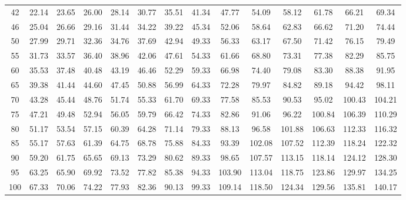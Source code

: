 \begin{center}
\begin{tabular}{c | c c c c c c c c c c c c c}
42 & 22.14 & 23.65 & 26.00 & 28.14 & 30.77 & 35.51 & 41.34 & 47.77 & 54.09 & 58.12 & 61.78 & 66.21 & 69.34 \\
46 & 25.04 & 26.66 & 29.16 & 31.44 & 34.22 & 39.22 & 45.34 & 52.06 & 58.64 & 62.83 & 66.62 & 71.20 & 74.44 \\
50 & 27.99 & 29.71 & 32.36 & 34.76 & 37.69 & 42.94 & 49.33 & 56.33 & 63.17 & 67.50 & 71.42 & 76.15 & 79.49 \\
55 & 31.73 & 33.57 & 36.40 & 38.96 & 42.06 & 47.61 & 54.33 & 61.66 & 68.80 & 73.31 & 77.38 & 82.29 & 85.75 \\
60 & 35.53 & 37.48 & 40.48 & 43.19 & 46.46 & 52.29 & 59.33 & 66.98 & 74.40 & 79.08 & 83.30 & 88.38 & 91.95 \\
65 & 39.38 & 41.44 & 44.60 & 47.45 & 50.88 & 56.99 & 64.33 & 72.28 & 79.97 & 84.82 & 89.18 & 94.42 & 98.11 \\
70 & 43.28 & 45.44 & 48.76 & 51.74 & 55.33 & 61.70 & 69.33 & 77.58 & 85.53 & 90.53 & 95.02 & 100.43 & 104.21 \\
75 & 47.21 & 49.48 & 52.94 & 56.05 & 59.79 & 66.42 & 74.33 & 82.86 & 91.06 & 96.22 & 100.84 & 106.39 & 110.29 \\
80 & 51.17 & 53.54 & 57.15 & 60.39 & 64.28 & 71.14 & 79.33 & 88.13 & 96.58 & 101.88 & 106.63 & 112.33 & 116.32 \\
85 & 55.17 & 57.63 & 61.39 & 64.75 & 68.78 & 75.88 & 84.33 & 93.39 & 102.08 & 107.52 & 112.39 & 118.24 & 122.32 \\
90 & 59.20 & 61.75 & 65.65 & 69.13 & 73.29 & 80.62 & 89.33 & 98.65 & 107.57 & 113.15 & 118.14 & 124.12 & 128.30 \\
95 & 63.25 & 65.90 & 69.92 & 73.52 & 77.82 & 85.38 & 94.33 & 103.90 & 113.04 & 118.75 & 123.86 & 129.97 & 134.25 \\
100 & 67.33 & 70.06 & 74.22 & 77.93 & 82.36 & 90.13 & 99.33 & 109.14 & 118.50 & 124.34 & 129.56 & 135.81 & 140.17 \\
\end{tabular}
\end{center}
\renewcommand{\arraystretch}{1.5}
\setlength{\tabcolsep}{5pt}